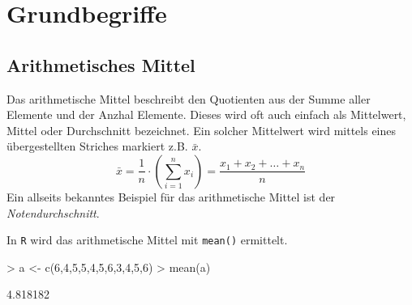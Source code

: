



\chapter{Grundbegriffe}
\newpage


\section{Arithmetisches Mittel}
Das \gls{arithmetische Mittel} beschreibt den Quotienten aus 
der Summe aller Elemente und der Anzhal Elemente. Dieses wird oft auch
einfach als Mittelwert, \gls{Mittel} oder \gls{Durchschnitt} bezeichnet. 
Ein solcher Mittelwert wird mittels eines übergestellten Striches 
markiert z.B.
$\bar{x}$.
\[ 
	\bar{x} 
	= \frac{1}{n} \cdot \left( \sum_{i=1}^{n} x_i \right)
	= \frac{x_1 + x_2 + \dots + x_n}{n}
\]
Ein allseits bekanntes Beispiel für das arithmetische Mittel ist der 
\emph{Notendurchschnitt}. 

In \lstinline{R} wird das arithmetische Mittel mit 
\lstinline{mean()} ermittelt.
\begin{Schunk}
\begin{Sinput}
> a <- c(6,4,5,5,4,5,6,3,4,5,6)
> mean(a)
\end{Sinput}
\begin{Soutput}
[1] 4.818182
\end{Soutput}
\end{Schunk}

